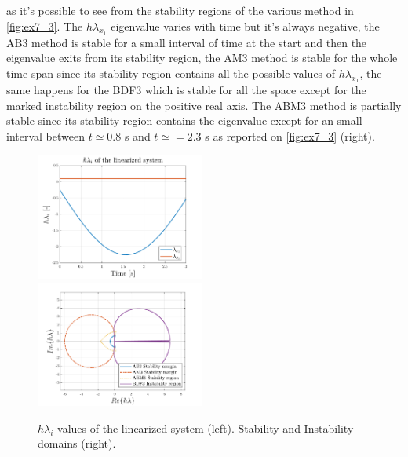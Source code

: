 \documentclass[11pt,a4paper,oneside]{article}
\begin{document}
as it's possible to see from the stability regions of the various method in \autoref{fig:ex7_3}. The $h\lambda_{x_1}$ 
eigenvalue varies with time but it's always negative, the AB3 method is stable for a small interval of time at the 
start and then the eigenvalue exits from its stability region, the AM3 method is stable for the whole time-span since
its stability region contains all the possible values of $h\lambda_{x_1}$, the same happens for the BDF3 which is stable
for all the space except for the marked instability region on the positive real axis. The ABM3 method is partially stable
since its stability region contains the eigenvalue except for an small interval between $t\simeq0.8$ s and $t\simeq=2.3$ s 
as reported on \autoref{fig:ex7_3} (right).


\begin{figure}[h]
    \includegraphics[width=0.495\textwidth]{gfx/ex7_5.pdf}
    \includegraphics[width=0.495\textwidth]{gfx/ex7_6.pdf}
    \caption{$h\lambda_i$ values of the linearized system (left). Stability and Instability domains (right).}
    \label{fig:ex7_3}
\end{figure}





\clearpage
\end{document}
